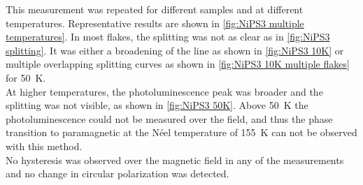 \documentclass[
	twoside,
	parskip=half,
	a4paper,
]{scrbook}
\begin{document}
This measurement was repeated for different samples and at different temperatures.
Representative results are shown in \autoref{fig:NiPS3 multiple temperatures}.
In most flakes, the splitting was not as clear as in \autoref{fig:NiPS3 splitting}.
It was either a broadening of the line as shown in \autoref{fig:NiPS3 10K} or multiple overlapping splitting curves as shown in \autoref{fig:NiPS3 10K multiple flakes} for \SI{50}{K}.\\
At higher temperatures, the photoluminescence peak was broader and the splitting was not visible, as shown in \autoref{fig:NiPS3 50K}.
Above \SI{50}{K} the photoluminescence could not be measured over the field, and thus the phase transition to paramagnetic at the Néel temperature of \SI{155}{K} \cite{MPS_magnetism} can not be observed with this method.\\
No hysteresis was observed over the magnetic field in any of the measurements and no change in circular polarization was detected.

\clearpage
\end{document}
